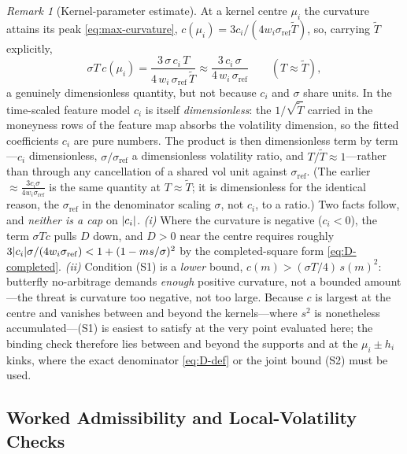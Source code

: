 \documentclass[11pt]{book}
\theoremstyle{plain}
\theoremstyle{definition}
\theoremstyle{remark}
\newtheorem{remark}[theorem]{Remark}
\newcommand{\mln}{m}                             %
\newcommand{\sref}{\sigma_{\mathrm{ref}}}        %
\DeclarePairedDelimiter{\abs}{\lvert}{\rvert}
\begin{document}
\begin{remark}[Kernel-parameter estimate]\label{rem:kernel-estimate}
At a kernel centre $\mu_i$ the curvature attains its peak
\eqref{eq:max-curvature}, $c(\mu_i)=3c_i/(4w_i\sref\tilde T)$, so, carrying
$\tilde T$ explicitly,
\[
\sigma T\,c(\mu_i) = \frac{3\,\sigma\,c_i\,T}{4\,w_i\,\sref\,\tilde T}
\approx \frac{3\,c_i\,\sigma}{4\,w_i\,\sref}
\qquad (T\approx\tilde T),
\]
a genuinely dimensionless quantity, but not because $c_i$ and $\sigma$ share
units. In the time-scaled feature model $c_i$ is itself \emph{dimensionless}:
the $1/\sqrt{\tilde T}$ carried in the moneyness rows of the feature map absorbs
the volatility dimension, so the fitted coefficients $c_i$ are pure numbers. The
product is then dimensionless term by term---$c_i$ dimensionless, $\sigma/\sref$
a dimensionless volatility ratio, and $T/\tilde T\approx1$---rather than through
any cancellation of a shared vol unit against $\sref$. (The earlier
$\approx\frac{3c_i\sigma}{4w_i\sref}$ is the same quantity at $T\approx\tilde T$;
it is dimensionless for the identical reason, the $\sref$ in the denominator
scaling $\sigma$, not $c_i$, to a ratio.) Two facts follow, and \emph{neither
is a cap} on $\abs{c_i}$. \emph{(i)} Where the curvature is negative
($c_i<0$), the term $\sigma T c$ pulls $D$ down, and $D>0$ near the centre
requires roughly $3\abs{c_i}\sigma/(4w_i\sref) < 1+(1-\mln s/\sigma)^2$ by the
completed-square form \eqref{eq:D-completed}. \emph{(ii)} Condition (S1) is a
\emph{lower} bound, $c(\mln)>(\sigma T/4)\,s(\mln)^2$: butterfly no-arbitrage
demands \emph{enough} positive curvature, not a bounded amount---the threat is
curvature too negative, not too large. Because $c$ is largest at the centre and
vanishes between and beyond the kernels---where $s^2$ is nonetheless
accumulated---(S1) is easiest to satisfy at the very point evaluated here; the
binding check therefore lies between and beyond the supports and at the
$\mu_i\pm h_i$ kinks, where the exact denominator
\eqref{eq:D-def} or the joint bound (S2) must be used.
\end{remark}

\subsection{Worked Admissibility and Local-Volatility Checks}
\label{sec:admissibility-examples}
\end{document}
